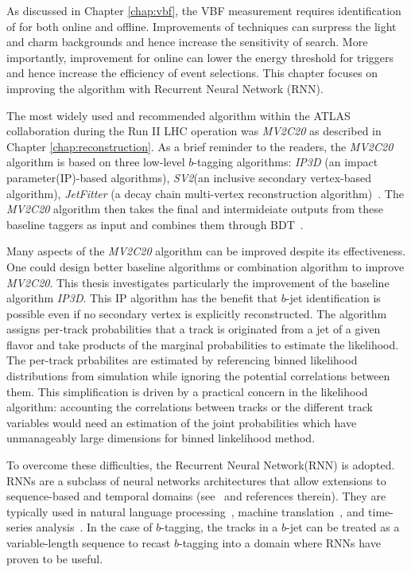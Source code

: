 As discussed in Chapter \ref{chap:vbf}, the VBF \Hbb measurement requires identification of \bjets for both online and offline. Improvements of \btagging techniques can surpress the light and charm backgrounds and hence increase the sensitivity of \Hbb search. More importantly, improvement for online \btagging can lower the energy threshold for \bjet triggers and hence increase the efficiency of \Hbb event selections. This chapter focuses on improving the \btagging algorithm with Recurrent Neural Network (RNN). 

The most widely used and recommended \btagging algorithm within the ATLAS collaboration during the Run II LHC operation was \textit{MV2C20} as described in Chapter \ref{chap:reconstruction}. As a brief reminder to the readers, the \textit{MV2C20} algorithm is based on three low-level $b$-tagging algorithms: \textit{IP3D} (an impact parameter(IP)-based algorithms), \textit{SV2}(an inclusive secondary vertex-based algorithm), \textit{JetFitter} (a decay chain multi-vertex reconstruction algorithm)~\cite{ref:btagPaper}. The \textit{MV2C20} algorithm then takes the final and intermideiate outputs from these baseline taggers as input and combines them through BDT~\cite{ATL-PHYS-PUB-2016-012}.

Many aspects of the \textit{MV2C20} algorithm can be improved despite its effectiveness. One could design better baseline algorithms or combination algorithm to improve \textit{MV2C20}. This thesis investigates particularly the improvement of the baseline algorithm \textit{IP3D}. This IP algorithm has the benefit that $b$-jet identification is possible even if no secondary vertex is explicitly reconstructed. The algorithm assigns per-track probabilities that a track is originated from a jet of a given flavor and take products of the marginal probabilities to estimate the likelihood. The per-track prbabilites are estimated by referencing binned likelihood distributions from simulation while ignoring the potential correlations between them. This simplification is driven by a practical concern in the likelihood algorithm: accounting the correlations between tracks or the different track variables would need an estimation of the joint probabilities which have unmanageably large dimensions for binned linkelihood method.

To overcome these difficulties, the Recurrent Neural Network(RNN) is adopted. RNNs are a subclass of neural networks architectures that allow extensions to sequence-based and temporal domains (see~\cite{ref:RNNthesis} and references therein). They are typically used in natural language processing~\cite{languagemodel,DBLP:journals/corr/abs-1303-5778}, machine translation~\cite{MT,MT2}, and time-series analysis~\cite{timeseries,timeseries2}. In the case of $b$-tagging, the tracks in a $b$-jet can be treated as a variable-length sequence to recast $b$-tagging into a domain where RNNs have proven to be useful.


